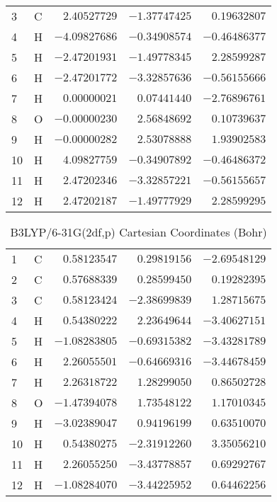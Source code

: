 \documentclass[10pt,oneside]{article}
\begin{document}
\begin{table}[h!]
\begin{multicols}{2}
\begin{tabular}{llrrr}
3  & C  & $ 2.40527729$ & $-1.37747425$ & $ 0.19632807$ \\
4  & H  & $-4.09827686$ & $-0.34908574$ & $-0.46486377$ \\
5  & H  & $-2.47201931$ & $-1.49778345$ & $ 2.28599287$ \\
6  & H  & $-2.47201772$ & $-3.32857636$ & $-0.56155666$ \\
7  & H  & $ 0.00000021$ & $ 0.07441440$ & $-2.76896761$ \\
8  & O  & $-0.00000230$ & $ 2.56848692$ & $ 0.10739637$ \\
9  & H  & $-0.00000282$ & $ 2.53078888$ & $ 1.93902583$ \\
10 & H  & $ 4.09827759$ & $-0.34907892$ & $-0.46486372$ \\
11 & H  & $ 2.47202346$ & $-3.32857221$ & $-0.56155657$ \\
12 & H  & $ 2.47202187$ & $-1.49777929$ & $ 2.28599295$ \\
\bottomrule
\end{tabular}
\end{multicols}
\end{table}

\begin{table}[h]
\centering
\caption{B3LYP/6-31G(2df,p) Cartesian Coordinates (Bohr)}
\begin{tabular}{llrrr}
\toprule
1  & C  & $ 0.58123547$ & $ 0.29819156$ & $-2.69548129$ \\
2  & C  & $ 0.57688339$ & $ 0.28599450$ & $ 0.19282395$ \\
3  & C  & $ 0.58123424$ & $-2.38699839$ & $ 1.28715675$ \\
4  & H  & $ 0.54380222$ & $ 2.23649644$ & $-3.40627151$ \\
5  & H  & $-1.08283805$ & $-0.69315382$ & $-3.43281789$ \\
6  & H  & $ 2.26055501$ & $-0.64669316$ & $-3.44678459$ \\
7  & H  & $ 2.26318722$ & $ 1.28299050$ & $ 0.86502728$ \\
8  & O  & $-1.47394078$ & $ 1.73548122$ & $ 1.17010345$ \\
9  & H  & $-3.02389047$ & $ 0.94196199$ & $ 0.63510070$ \\
10 & H  & $ 0.54380275$ & $-2.31912260$ & $ 3.35056210$ \\
11 & H  & $ 2.26055250$ & $-3.43778857$ & $ 0.69292767$ \\
12 & H  & $-1.08284070$ & $-3.44225952$ & $ 0.64462256$ \\
\bottomrule
\end{tabular}
\end{table}
\end{document}
